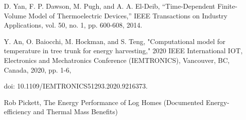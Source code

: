 \documentclass{IEEEtran} %
\begin{document}
\begin{enumerate}[label={[\arabic*]}]
\item D. Yan, F. P. Dawson, M. Pugh, and A. A. El-Deib, “Time-Dependent Finite-Volume Model of Thermoelectric Devices,” IEEE Transactions on Industry Applications, vol. 50, no. 1, pp. 600-608, 2014.\label{thermoelectric}

\item Y. An, O. Baiocchi, M. Hockman, and S. Teng, "Computational model for temperature in tree trunk for energy harvesting," 2020 IEEE International IOT, Electronics and Mechatronics Conference (IEMTRONICS), Vancouver, BC, Canada, 2020, pp. 1-6, 

doi: 10.1109/IEMTRONICS51293.2020.9216373.\label{1Dtree}

\item Rob Pickett, The Energy Performance of
Log Homes (Documented Energy-efficiency and Thermal Mass Benefits)\label{logparameter}





 


\end{enumerate}

\end{document}
